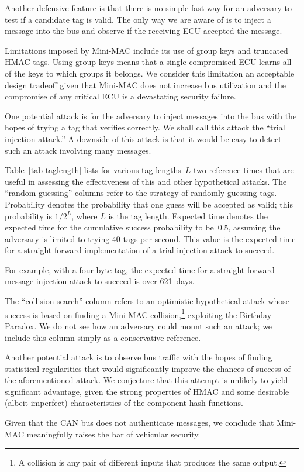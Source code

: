 Another defensive feature is that there is no simple fast way for an adversary to
test if a candidate tag is valid.   The only way we are aware of is to inject a message into the bus
and observe if the receiving ECU accepted the message.

Limitations imposed by Mini-MAC include its use of group keys and truncated HMAC tags.  
Using group keys means that a single compromised ECU learns all of the keys
to which groups it belongs.  We consider this limitation an acceptable design tradeoff
given that Mini-MAC does not increase bus utilization and the compromise of any critical
ECU is a devastating security failure.

One potential attack is for the adversary to inject messages into the bus with the hopes
of trying a tag that verifies correctly.  We shall call this attack the ``trial injection attack.''
A downside of this attack is that it would be easy to detect such an attack involving
many messages.

Table~\ref{tab-taglength} lists for various tag lengths~$L$
two reference times that are useful in assessing the effectiveness of this and other hypothetical attacks.
The ``random guessing'' columns refer to the strategy of randomly guessing tags.
Probability denotes the probability that one guess will be accepted as valid; this probability
is $1/2^{L}$, where $L$ is the tag length.
Expected time denotes the expected time for the cumulative success probability to be~0.5,
assuming the adversary is limited to trying 40 tags per second.
This value is the expected time for a straight-forward 
implementation of a trial injection attack to succeed.  

For example, with a four-byte tag, the expected time for a straight-forward 
message injection attack to succeed is over 621~days.  

The ``collision search'' column refers to an optimistic hypothetical attack whose success is based on
finding a Mini-MAC collision,\footnote{A collision is any pair of 
different inputs that produces the same output.}
exploiting the Birthday Paradox.  
We do not see how an adversary could mount such an attack;
we include this column simply as a conservative reference.

Another potential attack is to observe bus traffic with the hopes of finding statistical
regularities that would significantly improve the chances of success of the aforementioned attack.
We conjecture that this attempt is unlikely to yield significant advantage, given the
strong properties of HMAC and some
desirable (albeit imperfect) characteristics of the component hash functions.

Given that the CAN bus does not authenticate messages, we conclude that Mini-MAC
meaningfully raises the bar of vehicular security.


	
